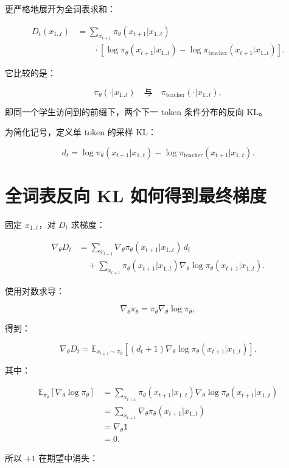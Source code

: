 \documentclass[11pt,a4paper,fontset=fandol]{ctexart}
\begin{document}
更严格地展开为全词表求和：

\[
\begin{aligned}
D_t(x_{1..t})
&=
\sum_{x_{t+1}}
\pi_\theta(x_{t+1}|x_{1..t})\\
&\qquad\cdot
\left[
\log\pi_\theta(x_{t+1}|x_{1..t})
-
\log\pi_{\text{teacher}}(x_{t+1}|x_{1..t})
\right].
\end{aligned}
\]

它比较的是：

\[
\pi_\theta(\cdot|x_{1..t})
\quad\text{与}\quad
\pi_{\text{teacher}}(\cdot|x_{1..t}),
\]

即同一个学生访问到的前缀下，两个下一 token 条件分布的反向 KL。

为简化记号，定义单 token 的采样 KL：

\[
d_t
=
\log\pi_\theta(x_{t+1}|x_{1..t})
-
\log\pi_{\text{teacher}}(x_{t+1}|x_{1..t}).
\]

\section{全词表反向 KL 如何得到最终梯度}

固定 \(x_{1..t}\)，对 \(D_t\) 求梯度：

\[
\begin{aligned}
\nabla_\theta D_t
&=
\sum_{x_{t+1}}
\nabla_\theta\pi_\theta(x_{t+1}|x_{1..t})\,d_t\\
&\quad+
\sum_{x_{t+1}}
\pi_\theta(x_{t+1}|x_{1..t})
\nabla_\theta\log\pi_\theta(x_{t+1}|x_{1..t}).
\end{aligned}
\]

使用对数求导：

\[
\nabla_\theta\pi_\theta
=
\pi_\theta\nabla_\theta\log\pi_\theta,
\]

得到：

\[
\nabla_\theta D_t
=
\mathbb E_{x_{t+1}\sim\pi_\theta}
\left[
(d_t+1)
\nabla_\theta\log\pi_\theta(x_{t+1}|x_{1..t})
\right].
\]

其中：

\[
\begin{aligned}
\mathbb E_{\pi_\theta}
\left[
\nabla_\theta\log\pi_\theta
\right]
&=
\sum_{x_{t+1}}
\pi_\theta(x_{t+1}|x_{1..t})
\nabla_\theta\log\pi_\theta(x_{t+1}|x_{1..t})\\
&=
\sum_{x_{t+1}}
\nabla_\theta\pi_\theta(x_{t+1}|x_{1..t})\\
&=
\nabla_\theta 1\\
&=0.
\end{aligned}
\]

所以 \(+1\) 在期望中消失：
\end{document}
